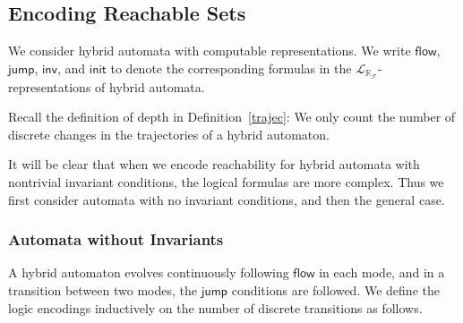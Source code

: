 \documentclass[envcountsect]{llncs}
\newcommand{\flow}{\mathsf{flow}}
\newcommand{\jump}{\mathsf{jump}}
\newcommand{\inv}{\mathsf{inv}}
\newcommand{\init}{\mathsf{init}}
\newcommand{\lrf}{\mathcal{L}_{\mathbb{R}_{\mathcal{F}}}}
\begin{document}
\subsection{Encoding Reachable Sets}

We consider hybrid automata with computable representations.  We write $\flow$,
$\jump$, $\inv$, and $\init$ to denote the corresponding formulas in the
$\lrf$-representations of hybrid automata. 

\begin{remark}
Recall the definition of depth in Definition~\ref{trajec}: We only count the
number of discrete changes in the trajectories of a hybrid automaton. 
\end{remark}

It will be clear that when we encode reachability for hybrid automata with
nontrivial invariant conditions, the logical formulas are more complex. Thus we
first consider automata with no invariant conditions, and then the general
case. 


\subsubsection{Automata without Invariants}

A hybrid automaton evolves continuously following $\flow$ in each mode, and in
a transition between two modes, the $\jump$ conditions are followed. We define
the logic encodings inductively on the number of discrete transitions as
follows. 
\end{document}
